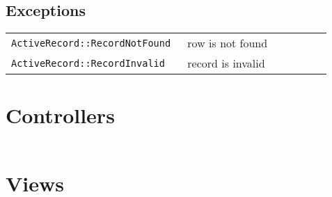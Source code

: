 \documentclass[6pt]{article}
\begin{document}
\begin{multicols}{3}
  \subsection{Exceptions}
  \begin{tabular}{L{0.55\linewidth} L{0.45\linewidth}}
    \tt ActiveRecord::RecordNotFound & row is not found\\
    \tt ActiveRecord::RecordInvalid & record is invalid\\
  \end{tabular}

  \section{Controllers}
  \begin{tabular}{L{0.55\linewidth} L{0.45\linewidth}}
  \end{tabular}

  \section{Views}
  \begin{tabular}{L{0.55\linewidth} L{0.45\linewidth}}
  \end{tabular}


\end{multicols}
\end{document}
